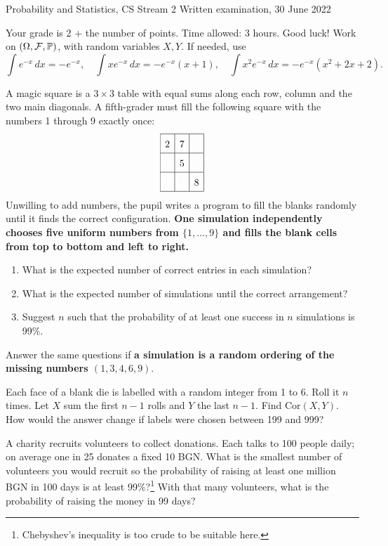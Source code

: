 \documentclass[a4paper]{report}
\begin{document}
\noindent Probability and Statistics, CS Stream 2 \hfill Written examination, 30 June 2022
\hrulefill
\begin{it}Your grade is 2 + the number of points. Time allowed: 3 hours. Good luck! Work on $(\Omega,\mathcal F,\P)$, with random variables $X,Y$. If needed, use
\[\int e^{-x}\,dx=-e^{-x},\quad\int xe^{-x}\,dx=-e^{-x}(x+1),\quad\int x^2e^{-x}\,dx=-e^{-x}(x^2+2x+2).\]
\end{it}
\begin{problem}
A magic square is a $3\times3$ table with equal sums along each row, column and the two main diagonals. A fifth-grader must fill the following square with the numbers 1 through 9 exactly once:
\[\renewcommand{\arraystretch}{1.6}\begin{array}{|c|c|c|}\hline2&7&\phantom9\\\hline\phantom1&5&\phantom3\\\hline\phantom4&\phantom9&8\\\hline\end{array}\]
Unwilling to add numbers, the pupil writes a program to fill the blanks randomly until it finds the correct configuration. \textbf{One simulation independently chooses five uniform numbers from $\{1,\ldots,9\}$ and fills the blank cells from top to bottom and left to right.}
\begin{enumerate}
\item What is the expected number of correct entries in each simulation?
\item What is the expected number of simulations until the correct arrangement?
\item Suggest $n$ such that the probability of at least one success in $n$ simulations is 99\%.
\end{enumerate}
Answer the same questions if \textbf{a simulation is a random ordering of the missing numbers $(1,3,4,6,9)$}.
\end{problem}
\begin{problem}
Each face of a blank die is labelled with a random integer from 1 to 6. Roll it $n$ times. Let $X$ sum the first $n-1$ rolls and $Y$ the last $n-1$. Find $\mathrm{Cor}(X,Y)$. How would the answer change if labels were chosen between 199 and 999?
\end{problem}
\begin{problem}
A charity recruits volunteers to collect donations. Each talks to 100 people daily; on average one in 25 donates a fixed 10 BGN. What is the smallest number of volunteers you would recruit so the probability of raising at least one million BGN in 100 days is at least 99\%?\footnote{Chebyshev's inequality is too crude to be suitable here.} With that many volunteers, what is the probability of raising the money in 99 days?
\end{problem}
\end{document}
